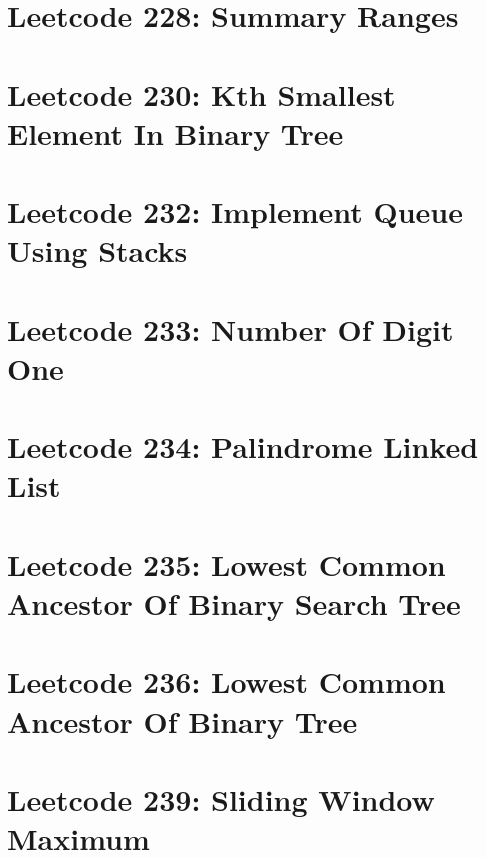 \documentclass{article}
\begin{document}
\section*{Leetcode 228: Summary Ranges}

\pagebreak 

\section*{Leetcode 230: Kth Smallest Element In Binary Tree}

\pagebreak 

\section*{Leetcode 232: Implement Queue Using Stacks}

\pagebreak 

\section*{Leetcode 233: Number Of Digit One}

\pagebreak 

\section*{Leetcode 234: Palindrome Linked List}

\pagebreak 

\section*{Leetcode 235: Lowest Common Ancestor Of Binary Search Tree}

\pagebreak 

\section*{Leetcode 236: Lowest Common Ancestor Of Binary Tree}

\pagebreak 

\section*{Leetcode 239: Sliding Window Maximum}

\pagebreak 
\end{document}
